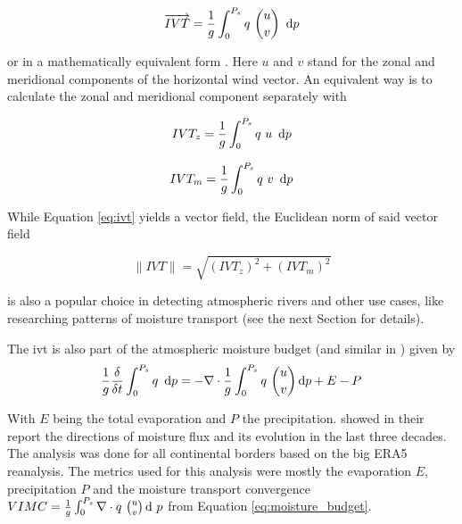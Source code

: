 \begin{equation}
\label{eq:ivt}  
\overrightarrow{IVT} = \frac{1}{g} \int^{P_s}_0 q ~\binom{u}{v} ~ \operatorname{d}\!{p}
\end{equation}

or in a mathematically equivalent form \cite{fernandez_analysis_2003}.
Here $u$ and $v$ stand for the zonal and meridional components of the horizontal wind vector. 
An equivalent way is to calculate the zonal and meridional component separately with 

\begin{equation}
\label{eq:zonal_ivt}
IVT_z = \frac{1}{g} \int^{P_s}_0 q ~u ~ \operatorname{d}\!{p}
\end{equation}


\begin{equation}
\label{eq:meridional_ivt}
IVT_m = \frac{1}{g} \int^{P_s}_0 q ~v ~ \operatorname{d}\!{p}
\end{equation}

While Equation \ref{eq:ivt} yields a vector field, the Euclidean norm of said vector field 

\begin{equation}
\label{eq:ivtnorm}
\lVert IVT \rVert = \sqrt{(IVT_z)^2 + (IVT_m)^2}  
\end{equation}

is also a popular choice in detecting atmospheric rivers \cite{sousa_north_2020, ramos_atmospheric_2016} and other use cases, like researching patterns of moisture transport \cite{ayantobo_integrated_2022, kim_ensos_2015, zhou_atmospheric_2005, zou_investigating_2020} (see the next Section for details).



The \ac{ivt} is also part of the atmospheric moisture budget \cite{yang_moisture_2022} (and similar in \cite{seager_mechanisms_2020}) given by 
\begin{equation}
\label{eq:moisture_budget}
\frac{1}{g} \frac{\delta}{\delta t} \int^{P_s}_0 q ~ \operatorname{d}\!{p} = - \nabla \cdot \frac{1}{g} \int^{P_s}_0 q ~\binom{u}{v} \operatorname{d}\!{p} + E - P
\end{equation}

With $E$ being the total evaporation and $P$ the precipitation. 
\citeauthor{yang_moisture_2022} showed in their report \cite{yang_moisture_2022} the directions of moisture flux and its evolution in the last three decades. The analysis was done for all continental borders based on the big ERA5 reanalysis.
The metrics used for this analysis were mostly the evaporation $E$, precipitation $P$ and the moisture transport convergence  $VIMC = \frac{1}{g} \int^{P_s}_0  \nabla \cdot q ~\binom{u}{v} \operatorname{d}\!{~} p$ from Equation \ref{eq:moisture_budget}.

